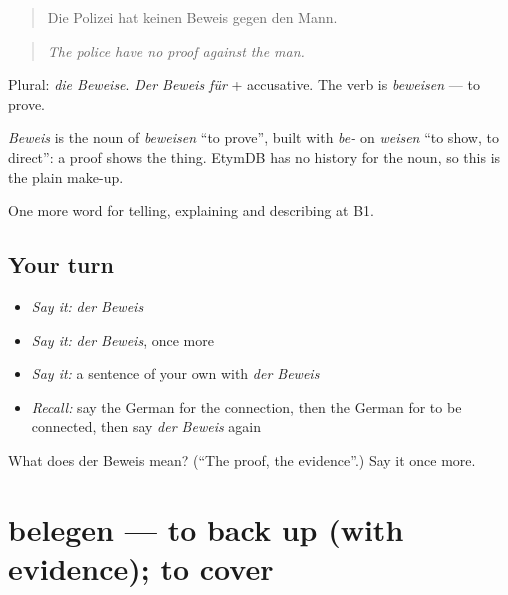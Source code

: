 \begin{quote}
Die Polizei hat keinen Beweis gegen den Mann.
\end{quote}

\begin{quote}
\emph{The police have no proof against the man.}
\end{quote}

Plural: \emph{die Beweise}. \emph{Der Beweis für} + accusative. The verb is \emph{beweisen} — to prove.

\begin{cousinweb}
\emph{Beweis} is the noun of \emph{beweisen} \textquotedblleft{}to prove\textquotedblright{}, built with \emph{be-} on \emph{weisen} \textquotedblleft{}to show, to direct\textquotedblright{}: a proof shows the thing. EtymDB has no history for the noun, so this is the plain make-up.
\end{cousinweb}

\begin{grammarlens}[title={What you've built}]
One more word for telling, explaining and describing at B1.
\end{grammarlens}

\subsection*{Your turn}
\begin{itemize}
\raggedright
  \item \emph{Say it:} \emph{der Beweis}
  \item \emph{Say it:} \emph{der Beweis}, once more
  \item \emph{Say it:} a sentence of your own with \emph{der Beweis}
  \item \emph{Recall:} say the German for the connection, then the German for to be connected, then say \emph{der Beweis} again
\end{itemize}

\begin{tcolorbox}[breakable,colback=teal!4,colframe=teal!35!black,title={Before you move on}]
What does der Beweis mean? (\textquotedblleft{}The proof, the evidence\textquotedblright{}.) Say it once more.
\end{tcolorbox}
\section[belegen]{belegen — to back up (with evidence); to cover}

\label{lesson:GE-C345-belegen}



